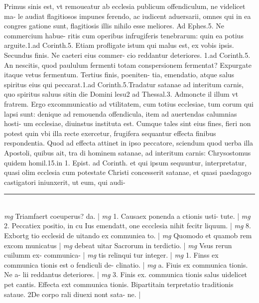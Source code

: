 \documentclass{article}
\begin{document}
\begin{pages}
Primus sinis est, vt remoueatur ab ecclesia publicum offendiculum, ne videlicet ma- le audiat flagitiosos impunes ferendo, ac iudicent aduersarii, omnes qui in ea congres gatione sunt, flagitiosis illis nihilo esse meliores. Ad Ephes.5. Ne commercium habue- ritis cum operibus infrugiferis tenebrarum: quin ea potius arguite.1.ad Corinth.5. Etiam profligate istum qui malus est, ex vobis ipsis. Secundus finis. Ne caeteri eius commer- cio reddantur deteriores. 1.ad Corinth.5. An nescitis, quod paululum fermenti totam conspersionem fermentat? Expurgate itaque  vetus fermentum. Tertius finis, poeniten- tia, emendatio, atque  salus spiritus eius qui peccarat.1.ad Corinth.5.Tradatur satanae ad interitum carnis, quo spiritus saluus sitin die Domini lesu2 ad Thessal.3. Admoncte il illum vt fratrem. Ergo excommunicatio ad vtilitatem, cum totius ecclesiae, tum corum qui lapsi sunt: denique  ad remouenda offendicula, item ad auertendas calumnias hosti- um ecclesiae, diuinstus instituta est. Cumque tales sint eius fines, fieri non potest quin vbi illa recte exercetur, frugifera sequantur effecta finibus respondentia. Quod ad effecta attinet in ipso peccatore, sciendum quod uerba illa Apostoli, quibus ait, tra di hominem satanae, ad interitum carnis: Chrysostomus quidem homil.15.in 1. Epist. ad Corinth. et qui ipsum sequuntur, interpretatur, quasi olim ecclesia cum potestate Christi concesserit satanae, et quasi paedagogo castigatori iniunxerit, ut eum, qui audi-  \pend
\vspace{0.5cm}\noindent
\vspace{0.2cm}\rule{1cm}{0.2pt}\\ 
\hspace{0.2cm}\textit{mg}
\footnotesize Triamfaert coeuperus? da. 
\normalsize| 
\hspace{0.2cm}\textit{mg}
\footnotesize 1. Causaex ponenda a ctionis usti- tute. 
\normalsize| 
\hspace{0.2cm}\textit{mg}
\footnotesize 2. Peccatiex positio, in cu Ius emendatt, one eccclesia nihit fecitr liquum. 
\normalsize| 
\hspace{0.2cm}\textit{mg}
\footnotesize 8. Exbortg tio ecclesid de uitando ex communiea to. 
\normalsize| 
\hspace{0.2cm}\textit{mg}
\footnotesize Quomodo et quamob rem excom municatus 
\normalsize| 
\hspace{0.2cm}\textit{mg}
\footnotesize debeat uitar Sacrorum in terdictio. 
\normalsize| 
\hspace{0.2cm}\textit{mg}
\footnotesize Vsus rerun cuilumm ex- communica- 
\normalsize| 
\hspace{0.2cm}\textit{mg}
\footnotesize tis relinqui tur integer. 
\normalsize| 
\hspace{0.2cm}\textit{mg}
\footnotesize 1. Finss ex communica tionis est o fendiculi de- clinatio. 
\normalsize| 
\hspace{0.2cm}\textit{mg}
\footnotesize a. Fiuis ex communica tionis. Ne a- lii reddantus deteriores. 
\normalsize| 
\hspace{0.2cm}\textit{mg}
\footnotesize 3. Finis ex. communica tionis salus uidelicet pet cantis. Effecta ext communica tionis. Bipartitain terpretatio traditionis sataue. 2De corpo rali diuexi nont sata- ne. 
\normalsize| 

\end{pages}
\end{document}
